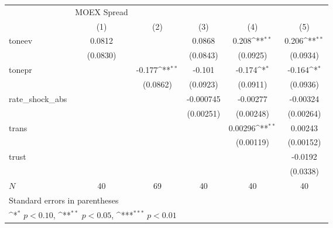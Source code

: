 {
\def\sym#1{\ifmmode^{#1}\else\(^{#1}\)\fi}
\begin{tabular}{l*{5}{c}}
\hline\hline
            & MOEX Spread         &                     &                     &                     &                     \\
            &\multicolumn{1}{c}{(1)}         &\multicolumn{1}{c}{(2)}         &\multicolumn{1}{c}{(3)}         &\multicolumn{1}{c}{(4)}         &\multicolumn{1}{c}{(5)}         \\
\hline
toneev      &      0.0812         &                     &      0.0868         &       0.208\sym{**} &       0.206\sym{**} \\
            &    (0.0830)         &                     &    (0.0843)         &    (0.0925)         &    (0.0934)         \\
[1em]
tonepr      &                     &      -0.177\sym{**} &      -0.101         &      -0.174\sym{*}  &      -0.164\sym{*}  \\
            &                     &    (0.0862)         &    (0.0923)         &    (0.0911)         &    (0.0936)         \\
[1em]
rate\_shock\_abs&                     &                     &   -0.000745         &    -0.00277         &    -0.00324         \\
            &                     &                     &   (0.00251)         &   (0.00248)         &   (0.00264)         \\
[1em]
trans       &                     &                     &                     &     0.00296\sym{**} &     0.00243         \\
            &                     &                     &                     &   (0.00119)         &   (0.00152)         \\
[1em]
trust       &                     &                     &                     &                     &     -0.0192         \\
            &                     &                     &                     &                     &    (0.0338)         \\
\hline
\(N\)       &          40         &          69         &          40         &          40         &          40         \\
\hline\hline
\multicolumn{6}{l}{\footnotesize Standard errors in parentheses}\\
\multicolumn{6}{l}{\footnotesize \sym{*} \(p<0.10\), \sym{**} \(p<0.05\), \sym{***} \(p<0.01\)}\\
\end{tabular}
}

